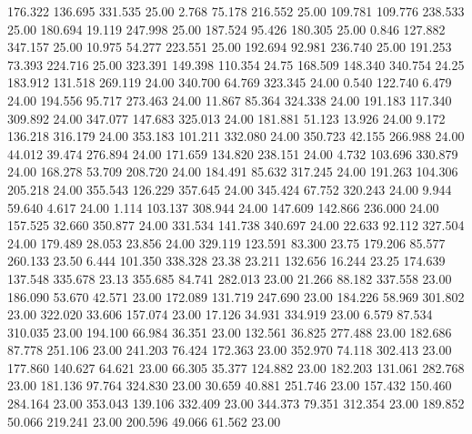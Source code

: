  176.322  136.695  331.535        25.00
   2.768   75.178  216.552        25.00
 109.781  109.776  238.533        25.00
 180.694   19.119  247.998        25.00
 187.524   95.426  180.305        25.00
   0.846  127.882  347.157        25.00
  10.975   54.277  223.551        25.00
 192.694   92.981  236.740        25.00
 191.253   73.393  224.716        25.00
 323.391  149.398  110.354        24.75
 168.509  148.340  340.754        24.25
 183.912  131.518  269.119        24.00
 340.700   64.769  323.345        24.00
   0.540  122.740    6.479        24.00
 194.556   95.717  273.463        24.00
  11.867   85.364  324.338        24.00
 191.183  117.340  309.892        24.00
 347.077  147.683  325.013        24.00
 181.881   51.123   13.926        24.00
   9.172  136.218  316.179        24.00
 353.183  101.211  332.080        24.00
 350.723   42.155  266.988        24.00
  44.012   39.474  276.894        24.00
 171.659  134.820  238.151        24.00
   4.732  103.696  330.879        24.00
 168.278   53.709  208.720        24.00
 184.491   85.632  317.245        24.00
 191.263  104.306  205.218        24.00
 355.543  126.229  357.645        24.00
 345.424   67.752  320.243        24.00
   9.944   59.640    4.617        24.00
   1.114  103.137  308.944        24.00
 147.609  142.866  236.000        24.00
 157.525   32.660  350.877        24.00
 331.534  141.738  340.697        24.00
  22.633   92.112  327.504        24.00
 179.489   28.053   23.856        24.00
 329.119  123.591   83.300        23.75
 179.206   85.577  260.133        23.50
   6.444  101.350  338.328        23.38
  23.211  132.656   16.244        23.25
 174.639  137.548  335.678        23.13
 355.685   84.741  282.013        23.00
  21.266   88.182  337.558        23.00
 186.090   53.670   42.571        23.00
 172.089  131.719  247.690        23.00
 184.226   58.969  301.802        23.00
 322.020   33.606  157.074        23.00
  17.126   34.931  334.919        23.00
   6.579   87.534  310.035        23.00
 194.100   66.984   36.351        23.00
 132.561   36.825  277.488        23.00
 182.686   87.778  251.106        23.00
 241.203   76.424  172.363        23.00
 352.970   74.118  302.413        23.00
 177.860  140.627   64.621        23.00
  66.305   35.377  124.882        23.00
 182.203  131.061  282.768        23.00
 181.136   97.764  324.830        23.00
  30.659   40.881  251.746        23.00
 157.432  150.460  284.164        23.00
 353.043  139.106  332.409        23.00
 344.373   79.351  312.354        23.00
 189.852   50.066  219.241        23.00
 200.596   49.066   61.562        23.00

